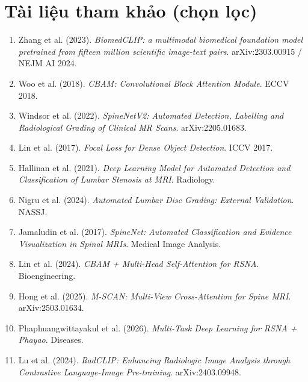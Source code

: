 \documentclass[11pt,a4paper]{article}
\begin{document}
\section{Tài liệu tham khảo (chọn lọc)}

\begin{enumerate}[leftmargin=*]
\item Zhang et al. (2023). \textit{BiomedCLIP: a multimodal biomedical
foundation model pretrained from fifteen million scientific image-text
pairs}. arXiv:2303.00915 / NEJM AI 2024.

\item Woo et al. (2018). \textit{CBAM: Convolutional Block Attention
Module}. ECCV 2018.

\item Windsor et al. (2022). \textit{SpineNetV2: Automated Detection,
Labelling and Radiological Grading of Clinical MR Scans}.
arXiv:2205.01683.

\item Lin et al. (2017). \textit{Focal Loss for Dense Object Detection}.
ICCV 2017.

\item Hallinan et al. (2021). \textit{Deep Learning Model for Automated
Detection and Classification of Lumbar Stenosis at MRI}. Radiology.

\item Nigru et al. (2024). \textit{Automated Lumbar Disc Grading:
External Validation}. NASSJ.

\item Jamaludin et al. (2017). \textit{SpineNet: Automated
Classification and Evidence Visualization in Spinal MRIs}. Medical
Image Analysis.

\item Lin et al. (2024). \textit{CBAM + Multi-Head Self-Attention for
RSNA}. Bioengineering.

\item Hong et al. (2025). \textit{M-SCAN: Multi-View Cross-Attention
for Spine MRI}. arXiv:2503.01634.

\item Phaphuangwittayakul et al. (2026). \textit{Multi-Task Deep
Learning for RSNA + Phayao}. Diseases.

\item Lu et al. (2024). \textit{RadCLIP: Enhancing Radiologic Image
Analysis through Contrastive Language-Image Pre-training}.
arXiv:2403.09948.


\end{enumerate}
\end{document}
